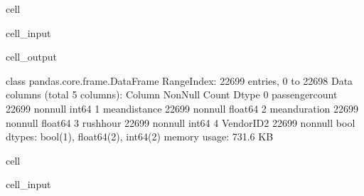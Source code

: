 \documentclass[letterpaper,10pt,english]{sphinxmanual}
\begin{document}
\begin{sphinxuseclass}{cell}
\begin{sphinxuseclass}{cell_input}
\begin{sphinxVerbatim}[commandchars=\\\{\}]
\end{sphinxVerbatim}

\end{sphinxuseclass}
\begin{sphinxuseclass}{cell_output}
\begin{sphinxVerbatim}[commandchars=\\\{\}]
\PYGZlt{}class \PYGZsq{}pandas.core.frame.DataFrame\PYGZsq{}\PYGZgt{}
RangeIndex: 22699 entries, 0 to 22698
Data columns (total 5 columns):
 \PYGZsh{}   Column           Non\PYGZhy{}Null Count  Dtype  
\PYGZhy{}\PYGZhy{}\PYGZhy{}  \PYGZhy{}\PYGZhy{}\PYGZhy{}\PYGZhy{}\PYGZhy{}\PYGZhy{}           \PYGZhy{}\PYGZhy{}\PYGZhy{}\PYGZhy{}\PYGZhy{}\PYGZhy{}\PYGZhy{}\PYGZhy{}\PYGZhy{}\PYGZhy{}\PYGZhy{}\PYGZhy{}\PYGZhy{}\PYGZhy{}  \PYGZhy{}\PYGZhy{}\PYGZhy{}\PYGZhy{}\PYGZhy{}  
 0   passenger\PYGZus{}count  22699 non\PYGZhy{}null  int64  
 1   mean\PYGZus{}distance    22699 non\PYGZhy{}null  float64
 2   mean\PYGZus{}duration    22699 non\PYGZhy{}null  float64
 3   rush\PYGZus{}hour        22699 non\PYGZhy{}null  int64  
 4   VendorID\PYGZus{}2       22699 non\PYGZhy{}null  bool   
dtypes: bool(1), float64(2), int64(2)
memory usage: 731.6 KB
\end{sphinxVerbatim}

\end{sphinxuseclass}
\end{sphinxuseclass}
\begin{sphinxuseclass}{cell}
\begin{sphinxuseclass}{cell_input}
\begin{sphinxVerbatim}[commandchars=\\\{\}]
  \PYG{p}{[}\PYG{p}{]}
\PYG{p}{[}\PYG{p}{]}  \PYG{p}{[}\PYG{p}{]}  \PYG{p}{[}\PYG{p}{]}
\end{sphinxVerbatim}

\end{sphinxuseclass}
\end{sphinxuseclass}
\end{document}
